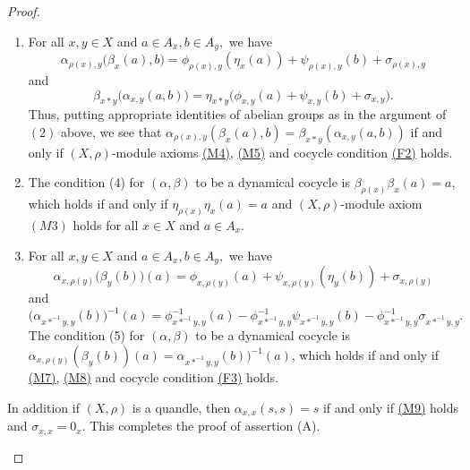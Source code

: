\documentclass[11pt,reqno]{amsart}
\theoremstyle{definition}
\numberwithin{equation}{subsection}
\begin{document}
\begin{proof}
\begin{enumerate}[(A)]
\begin{enumerate}[(1)]
			$$\alpha_{x*y,z} \big(\alpha_{x,y}(a,b),c \big)=	\alpha_{x*z,y*z} \big(\alpha_{x,z}(a,c),\alpha_{y,z}(b,c) \big),$$
which is condition (2) for $(\alpha, \beta)$ to be a dynamical cocycle.
			\item  For all $x,y\in X$ and $a \in A_x,b \in A_y,$ we have 
			$$\alpha_{\rho(x),y} \big(\beta_x(a),b \big)=\phi_{\rho(x),y}(\eta_x(a))+\psi_{\rho(x),y}(b)+\sigma_{\rho(x),y}$$ and 
			$$\beta_{x*y} \big(\alpha_{x,y}(a,b)\big)=\eta_{x*y} \big(\phi_{x,y}(a)+\psi_{x,y}(b)+\sigma_{x,y} \big).$$
Thus, putting appropriate identities of abelian groups as in the argument of $(2)$ above, we see that $\alpha_{\rho(x),y}(\beta_x(a),b)=\beta_{x*y}(\alpha_{x,y}(a,b))$ if and only if $(X,\rho)$-module axioms \hyperref[M4]{(M4)}, \hyperref[M5]{(M5)} and cocycle condition \hyperref[cocycle condition]{(F2)} holds.

\item The condition (4) for $(\alpha, \beta)$ to be a dynamical cocycle is $\beta_{\rho(x)}\beta_x(a)=a$, which holds if and only if $\eta_{\rho(x)}\eta_x(a)=a$ and $(X,\rho)$-module axiom $\hyperref[M3]{(M3)}$ holds for all $x \in X$ and $a \in A_x.$
\item For all $x,y\in X$ and $a \in A_x,b \in A_y,$ we have 
$$\alpha_{x,\rho(y)} \big(\beta_y(b)\big)(a)=\phi_{x,\rho(y)}(a)+\psi_{x,\rho(y)}(\eta_y(b))+\sigma_{x,\rho(y)}$$
and
$$\big(\alpha_{x*^{-1}y,y}(b) \big)^{-1}(a)=\phi^{-1}_{x*^{-1}y,y}(a)-\phi^{-1}_{x*^{-1}y,y}\psi_{x*^{-1}y,y}(b)-\phi^{-1}_{x*^{-1}y,y}\sigma_{x*^{-1}y,y}.$$
The condition (5) for $(\alpha, \beta)$ to be a dynamical cocycle is  $\alpha_{x,\rho(y)}(\beta_y(b))(a)=\alpha_{x*^{-1}y,y}(b))^{-1}(a)$, which holds if and only if \hyperref[M6]{(M7)}, \hyperref[M6]{(M8)} and cocycle condition \hyperref[cocycle condition]{(F3)} holds.
\end{enumerate}
In addition if $(X,\rho)$ is a quandle, then $\alpha_{x,x}(s,s)=s$ if and only if \hyperref[M9]{(M9)} holds and $\sigma_{x,x}=0_x.$ This completes the proof of assertion (A).


\end{enumerate}
\end{proof}
\end{document}
